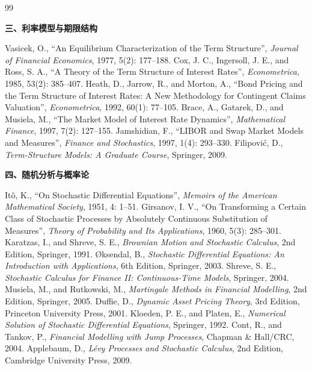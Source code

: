 \begin{thebibliography}{99}
\item[] \textbf{三、利率模型与期限结构}

 Vasicek, O., ``An Equilibrium Characterization of the Term Structure'', \emph{Journal of Financial Economics}, 1977, 5(2): 177--188.
 Cox, J. C., Ingersoll, J. E., and Ross, S. A., ``A Theory of the Term Structure of Interest Rates'', \emph{Econometrica}, 1985, 53(2): 385--407.
 Heath, D., Jarrow, R., and Morton, A., ``Bond Pricing and the Term Structure of Interest Rates: A New Methodology for Contingent Claims Valuation'', \emph{Econometrica}, 1992, 60(1): 77--105.
 Brace, A., Gatarek, D., and Musiela, M., ``The Market Model of Interest Rate Dynamics'', \emph{Mathematical Finance}, 1997, 7(2): 127--155.
 Jamshidian, F., ``LIBOR and Swap Market Models and Measures'', \emph{Finance and Stochastics}, 1997, 1(4): 293--330.
 Filipovi\'c, D., \emph{Term-Structure Models: A Graduate Course}, Springer, 2009.

\item[] \textbf{四、随机分析与概率论}

 It\^o, K., ``On Stochastic Differential Equations'', \emph{Memoirs of the American Mathematical Society}, 1951, 4: 1--51.
 Girsanov, I. V., ``On Transforming a Certain Class of Stochastic Processes by Absolutely Continuous Substitution of Measures'', \emph{Theory of Probability and Its Applications}, 1960, 5(3): 285--301.
 Karatzas, I., and Shreve, S. E., \emph{Brownian Motion and Stochastic Calculus}, 2nd Edition, Springer, 1991.
 \O ksendal, B., \emph{Stochastic Differential Equations: An Introduction with Applications}, 6th Edition, Springer, 2003.
 Shreve, S. E., \emph{Stochastic Calculus for Finance II: Continuous-Time Models}, Springer, 2004.
 Musiela, M., and Rutkowski, M., \emph{Martingale Methods in Financial Modelling}, 2nd Edition, Springer, 2005.
 Duffie, D., \emph{Dynamic Asset Pricing Theory}, 3rd Edition, Princeton University Press, 2001.
 Kloeden, P. E., and Platen, E., \emph{Numerical Solution of Stochastic Differential Equations}, Springer, 1992.
 Cont, R., and Tankov, P., \emph{Financial Modelling with Jump Processes}, Chapman \& Hall/CRC, 2004.
 Applebaum, D., \emph{L\'evy Processes and Stochastic Calculus}, 2nd Edition, Cambridge University Press, 2009.


\end{thebibliography}
